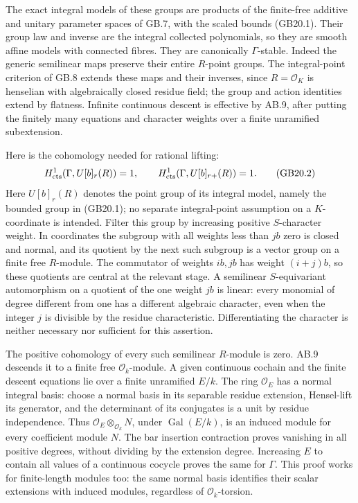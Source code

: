 \documentclass[
  11pt,
]{article}
\begin{document}
The exact integral models of these groups are products of the
finite-free additive and unitary parameter spaces of GB.7, with the
scaled bounds (GB20.1). Their group law and inverse are the integral
collected polynomials, so they are smooth affine models with connected
fibres. They are canonically \(\Gamma\)-stable. Indeed the generic
semilinear maps preserve their entire \(R\)-point groups. The
integral-point criterion of GB.8 extends these maps and their inverses,
since \(R=\mathcal O_K\) is henselian with algebraically closed residue
field; the group and action identities extend by flatness. Infinite
continuous descent is effective by AB.9, after putting the finitely many
equations and character weights over a finite unramified subextension.

Here is the cohomology needed for rational lifting: \[
                   H^1_{\rm cts}(\Gamma,U[b]_r(R))=1,
       \qquad H^1_{\rm cts}(\Gamma,U[b]_{r+}(R))=1.          \tag{GB20.2}
\] Here \(U[b]_r(R)\) denotes the point group of its integral model,
namely the bounded group in (GB20.1); no separate integral-point
assumption on a \(K\)-coordinate is intended. Filter this group by
increasing positive \(S\)-character weight. In coordinates the subgroup
with all weights less than \(j b\) zero is closed and normal, and its
quotient by the next such subgroup is a vector group on a finite free
\(R\)-module. The commutator of weights \(i b,j b\) has weight
\((i+j)b\), so these quotients are central at the relevant stage. A
semilinear \(S\)-equivariant automorphism on a quotient of the one
weight \(j b\) is linear: every monomial of degree different from one
has a different algebraic character, even when the integer \(j\) is
divisible by the residue characteristic. Differentiating the character
is neither necessary nor sufficient for this assertion.

The positive cohomology of every such semilinear \(R\)-module is zero.
AB.9 descends it to a finite free \(\mathcal O_k\)-module. A given
continuous cochain and the finite descent equations lie over a finite
unramified \(E/k\). The ring \(\mathcal O_E\) has a normal integral
basis: choose a normal basis in its separable residue extension,
Hensel-lift its generator, and the determinant of its conjugates is a
unit by residue independence. Thus
\(\mathcal O_E\otimes_{\mathcal O_k}N\), under
\(\operatorname{Gal}(E/k)\), is an induced module for every coefficient
module \(N\). The bar insertion contraction proves vanishing in all
positive degrees, without dividing by the extension degree. Increasing
\(E\) to contain all values of a continuous cocycle proves the same for
\(\Gamma\). This proof works for finite-length modules too: the same
normal basis identifies their scalar extensions with induced modules,
regardless of \(\mathcal O_k\)-torsion.
\end{document}
